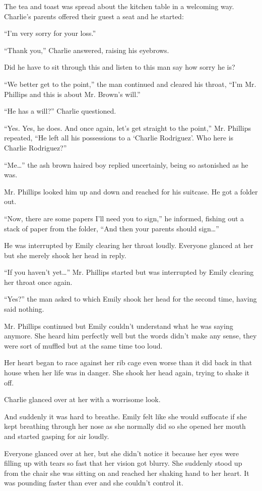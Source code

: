 The tea and toast was spread about the kitchen table in a welcoming way. Charlie’s parents offered their guest a seat and he started:

“I’m very sorry for your loss.”

“Thank you,” Charlie answered, raising his eyebrows.

Did he have to sit through this and listen to this man say how sorry he is?

“We better get to the point,” the man continued and cleared his throat, “I’m Mr. Phillips and this is about Mr. Brown’s will.”

“He has a will?” Charlie questioned.

“Yes. Yes, he does. And once again, let’s get straight to the point,” Mr. Phillips repeated, “He left all his possessions to a ‘Charlie Rodriguez’. Who here is Charlie Rodriguez?”

“Me…” the ash brown haired boy replied uncertainly, being so astonished as he was.

Mr. Phillips looked him up and down and reached for his suitcase. He got a folder out.

“Now, there are some papers I’ll need you to sign,” he informed, fishing out a stack of paper from the folder, “And then your parents should sign…”

He was interrupted by Emily clearing her throat loudly. Everyone glanced at her but she merely shook her head in reply.

“If you haven’t yet…” Mr. Phillips started but was interrupted by Emily clearing her throat once again.

“Yes?” the man asked to which Emily shook her head for the second time, having said nothing.

Mr. Phillips continued but Emily couldn’t understand what he was saying anymore. She heard him perfectly well but the words didn’t make any sense, they were sort of muffled but at the same time too loud.

Her heart began to race against her rib cage even worse than it did back in that house when her life was in danger. She shook her head again, trying to shake it off.

Charlie glanced over at her with a worrisome look.

And suddenly it was hard to breathe. Emily felt like she would suffocate if she kept breathing through her nose as she normally did so she opened her mouth and started gasping for air loudly.

Everyone glanced over at her, but she didn’t notice it because her eyes were filling up with tears so fast that her vision got blurry. She suddenly stood up from the chair she was sitting on and reached her shaking hand to her heart. It was pounding faster than ever and she couldn’t control it.

